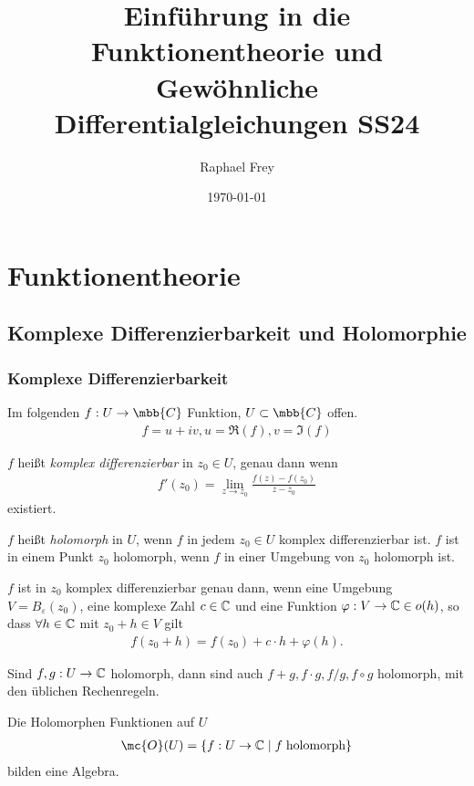 \documentclass[ngerman]{report}
\title{Einführung in die Funktionentheorie und Gewöhnliche Differentialgleichungen SS24}
\author{Raphael Frey}
\institute{Universität Tübingen}
\date{\today}
\begin{document}
\maketitle%
\tableofcontents%
\chapter{Funktionentheorie}
\section{Komplexe Differenzierbarkeit und Holomorphie}
\subsection{Komplexe Differenzierbarkeit}
Im folgenden $f:U\to\mbb{C}$ Funktion, $U\subset\mbb{C}$ offen. 
\begin{align*}
    f = u+iv, u = \Re(f), v = \Im(f)
\end{align*}
\begin{definition}
    $f$ heißt \emph{komplex differenzierbar} in $z_0 \in U$, genau dann wenn 
    \begin{align*}
        f'(z_0) = \lim_{z\to z_0} \frac{f(z)-f(z_0)}{z-z_0}
    \end{align*}
    existiert.
\end{definition}
\begin{definition}[Holomorphie]
    $f$ heißt \emph{holomorph} in $U$, wenn $f$ in jedem $z_0\in U$ komplex differenzierbar ist. $f$ ist in einem Punkt $z_0$ holomorph, wenn $f$ in einer Umgebung von $z_0$ holomorph ist.
\end{definition}
\begin{note}
    $f$ ist in $z_0$ komplex differenzierbar genau dann, wenn eine Umgebung $V = B_{\varepsilon}(z_0)$, eine komplexe Zahl $c\in \mathbb{C}$ und eine Funktion $\varphi: V\to \mathbb{C}\in o(h)$, so dass $\forall h\in \mathbb{C}$ mit $z_0+h\in V$ gilt
    \begin{align*}
        f(z_0+h) = f(z_0) + c\cdot h + \varphi(h).
    \end{align*}
\end{note}
\begin{lemma}
    Sind $f,g:U\to\mathbb{C}$ holomorph, dann sind auch $f+g, f\cdot g, f/g, f\circ g$ holomorph, mit den üblichen Rechenregeln.
\end{lemma}
\begin{lemma}
    Die Holomorphen Funktionen auf $U$ 
    \begin{align*}
        \mc{O}(U) = \{f:U\to\C\mid f\;\text{holomorph}\}
    \end{align*}   
    bilden eine Algebra.     
\end{lemma}
\end{document}
